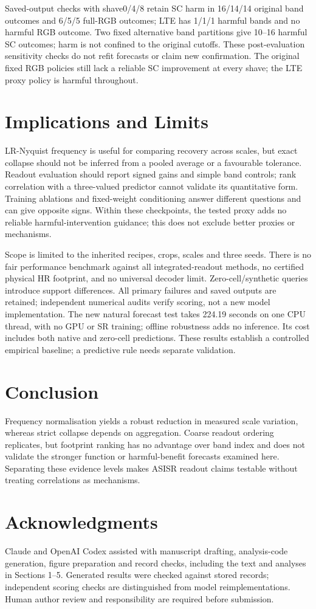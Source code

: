 Saved-output checks with shave0/4/8 retain SC harm in 16/14/14 original
band outcomes and 6/5/5 full-RGB outcomes; LTE has 1/1/1 harmful bands
and no harmful RGB outcome. Two fixed alternative band partitions give
10--16 harmful SC outcomes; harm is not confined to the original cutoffs.
These post-evaluation sensitivity checks do not refit forecasts or claim
new confirmation. The original fixed RGB policies still lack a reliable
SC improvement at every shave; the LTE proxy policy is harmful throughout.

\clearpage
\balance
\section{Implications and Limits}
LR-Nyquist frequency is useful for comparing recovery across scales,
but exact collapse should not be inferred from a pooled average or a
favourable tolerance. Readout evaluation should report signed gains and
simple band controls; rank correlation with a three-valued predictor
cannot validate its quantitative form. Training ablations and
fixed-weight conditioning answer different questions and can give
opposite signs. Within these checkpoints, the tested proxy adds no
reliable harmful-intervention guidance; this does not exclude better
proxies or mechanisms.

Scope is limited to the inherited recipes, crops, scales and three seeds.
There is no fair performance benchmark against all integrated-readout
methods, no certified physical HR footprint, and no universal decoder
limit. Zero-cell/synthetic queries introduce support differences. All
primary failures and saved outputs are retained; independent numerical
audits verify scoring, not a new model implementation. The new natural
forecast test takes 224.19 seconds on one CPU thread, with no GPU or SR
training; offline robustness adds no inference. Its cost includes both
native and zero-cell predictions. These results establish a controlled
empirical baseline; a predictive rule needs separate validation.

\section{Conclusion}
Frequency normalisation yields a robust reduction in measured scale
variation, whereas strict collapse depends on aggregation. Coarse
readout ordering replicates, but footprint ranking has no advantage
over band index and does not validate
the stronger function or harmful-benefit forecasts examined here.
Separating these evidence levels makes ASISR readout claims testable
without treating correlations as mechanisms.

\section{Acknowledgments}
Claude and OpenAI Codex assisted with manuscript drafting, analysis-code
generation, figure preparation and record checks, including the text
and analyses in Sections 1--5. Generated results were checked against
stored records; independent scoring checks are distinguished from model
reimplementations. Human author review and responsibility are required
before submission.
